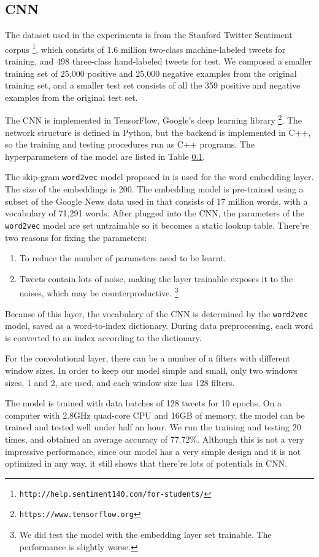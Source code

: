 \subsection{CNN}

The dataset used in the experiments is from the Stanford Twitter Sentiment corpus \footnote{\tt http://help.sentiment140.com/for-students/}, which consists of 1.6 million two-class machine-labeled tweets for training, and 498 three-class hand-labeled tweets for test. We composed a smaller training set of 25,000 positive and 25,000 negative examples from the original training set, and a smaller test set consists of all the 359 positive and negative examples from the original test set. 

The CNN is implemented in TensorFlow, Google's deep learning library \footnote{\tt https://www.tensorflow.org}. The network structure is defined in Python, but the backend is implemented in C++, so the training and testing procedures run as C++ programs. The hyperparameters of the model are listed in Table \ref{}. 

The skip-gram {\tt word2vec} model proposed in \cite{mikolov2013} is used for the word embedding layer. The size of the embeddings is 200. The embedding model is pre-trained using a subset of the Google News data used in \cite{mikolov2013} that consists of 17 million words, with a vocabulary of 71,291 words. After plugged into the CNN, the parameters of the {\tt word2vec} model are set untrainable so it becomes a static lookup table. There're two reasons for fixing the parameters:
\begin{enumerate}
\item To reduce the number of parameters need to be learnt.
\item Tweets contain lots of noise, making the layer trainable exposes it to the noises, which may be counterproductive. \footnote{We did test the model with the embedding layer set trainable. The performance is slightly worse.}
\end{enumerate}
Because of this layer, the vocabulary of the CNN is determined by the {\tt word2vec} model, saved as a word-to-index dictionary. During data preprocessing, each word is converted to an index according to the dictionary. 

For the convolutional layer, there can be a number of a filters with different window sizes. In order to keep our model simple and small, only two windows sizes, 1 and 2, are used, and each window size has 128 filters. 

The model is trained with data batches of 128 tweets for 10 epochs. On a computer with 2.8GHz quad-core CPU and 16GB of memory, the model can be trained and tested well under half an hour. We run the training and testing 20 times, and obtained an average accuracy of 77.72\%. Although this is not a very impressive performance, since our model has a very simple design and it is not optimized in any way, it still shows that there're lots of potentials in CNN.